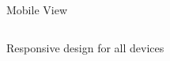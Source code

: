 \documentclass[aspectratio=169]{beamer}
\begin{document}
\begin{frame}{Mobile View}
    \begin{center}
        \begin{columns}
            \centering
            
            \centering
            
            \centering
        \end{columns}
        
        \vspace{1em}
        \small Responsive design for all devices
    \end{center}
\end{frame}
\end{document}
